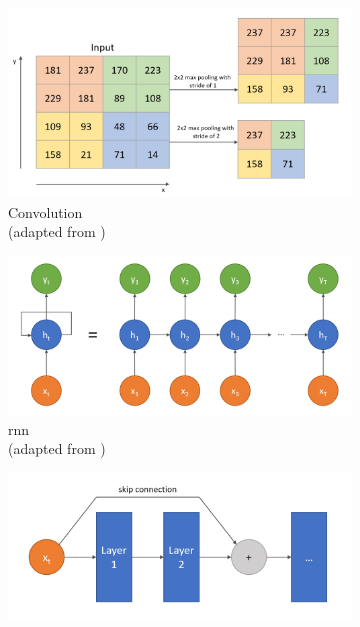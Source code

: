 \begin{figure}
    \begin{subfigure}{0.7\textwidth}
      \includegraphics[width=\linewidth]{images/cnns.png}
      \captionsetup{justification=centering}
      \caption{Convolution \\(adapted from \cite{rosebrock2021ConvolutionalNeuralNetworks})} \label{fig:cnns}
    \end{subfigure}%
    \hspace*{\fill}   %
    \begin{subfigure}{0.7\textwidth}
      \includegraphics[width=\linewidth]{images/rnns.png}
      \captionsetup{justification=centering}
      \caption{\Gls{rnn} \\(adapted from \cite{radhakrishnan2017IntroductionRecurrentNeural})} \label{fig:rnns}
    \end{subfigure}%
    \hspace*{\fill}   %
    \begin{subfigure}{0.7\textwidth}
        \includegraphics[width=\linewidth]{images/resnet.png}

\end{subfigure}
\end{figure}

